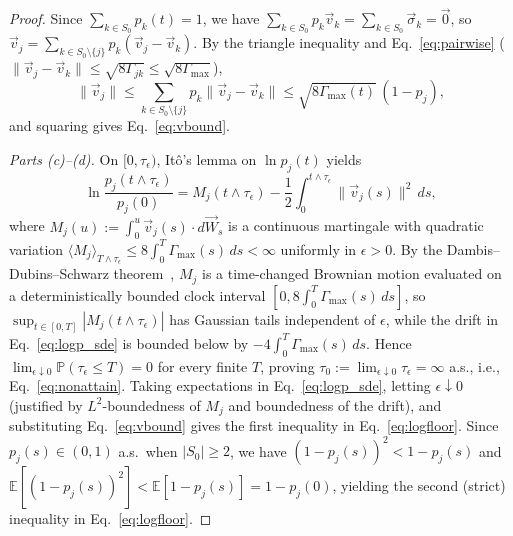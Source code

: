 \documentclass[aps,pra,10pt,twocolumn,superscriptaddress,amsmath,amssymb,floatfix]{revtex4-2}
\newcommand{\E}{\mathbb{E}}
\newcommand{\Prob}{\mathbb{P}}
\begin{document}
\begin{proof}
Since $\sum_{k \in S_0} p_k(t) = 1$, we have $\sum_{k \in S_0} p_k \vec{v}_k = \sum_{k \in S_0} \vec{\sigma}_k = \vec{0}$, so $\vec{v}_j = \sum_{k \in S_0 \setminus \{j\}} p_k(\vec{v}_j - \vec{v}_k)$. By the triangle inequality and Eq.~\eqref{eq:pairwise} ($\|\vec{v}_j - \vec{v}_k\| \le \sqrt{8\Gamma_{jk}} \le \sqrt{8\Gamma_{\max}}$),
\begin{equation*}
\|\vec{v}_j\| \le \sum_{k \in S_0 \setminus \{j\}} p_k \|\vec{v}_j - \vec{v}_k\| \le \sqrt{8\Gamma_{\max}(t)}\,(1-p_j),
\end{equation*}
and squaring gives Eq.~\eqref{eq:vbound}.

\emph{Parts (c)--(d).} On $[0, \tau_\epsilon)$, It\^o's lemma on $\ln p_j(t)$ yields
\begin{equation}
\label{eq:logp_sde}
\ln\frac{p_j(t \wedge \tau_\epsilon)}{p_j(0)} = M_j(t \wedge \tau_\epsilon) - \frac{1}{2}\int_0^{t \wedge \tau_\epsilon} \|\vec{v}_j(s)\|^2\,ds,
\end{equation}
where $M_j(u) := \int_0^u \vec{v}_j(s)\cdot d\vec{W}_s$ is a continuous martingale with quadratic variation $\langle M_j\rangle_{T \wedge \tau_\epsilon} \le 8\int_0^T \Gamma_{\max}(s)\,ds < \infty$ uniformly in $\epsilon > 0$. By the Dambis--Dubins--Schwarz theorem~\cite{RevuzYor1999}, $M_j$ is a time-changed Brownian motion evaluated on a deterministically bounded clock interval $[0, 8\int_0^T\Gamma_{\max}(s)\,ds]$, so $\sup_{t \in [0,T]} |M_j(t \wedge \tau_\epsilon)|$ has Gaussian tails independent of $\epsilon$, while the drift in Eq.~\eqref{eq:logp_sde} is bounded below by $-4\int_0^T\Gamma_{\max}(s)\,ds$. Hence $\lim_{\epsilon\downarrow 0}\Prob(\tau_\epsilon \le T) = 0$ for every finite $T$, proving $\tau_0 := \lim_{\epsilon\downarrow 0}\tau_\epsilon = \infty$ a.s., i.e., Eq.~\eqref{eq:nonattain}. Taking expectations in Eq.~\eqref{eq:logp_sde}, letting $\epsilon\downarrow 0$ (justified by $L^2$-boundedness of $M_j$ and boundedness of the drift), and substituting Eq.~\eqref{eq:vbound} gives the first inequality in Eq.~\eqref{eq:logfloor}. Since $p_j(s)\in(0,1)$ a.s.\ when $|S_0|\ge 2$, we have $(1-p_j(s))^2 < 1-p_j(s)$ and $\E[(1-p_j(s))^2] < \E[1-p_j(s)] = 1-p_j(0)$, yielding the second (strict) inequality in Eq.~\eqref{eq:logfloor}.
\end{proof}
\end{document}
